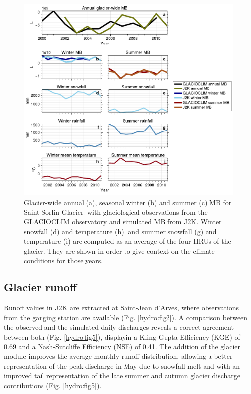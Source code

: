 \begin{figure}[h]
\centering
\includegraphics[width=15cm]{Figures/hydro/Figure_4.pdf}
\caption{Glacier-wide annual (a), seasonal winter (b) and summer (c) MB for Saint-Sorlin Glacier, with glaciological observations from the GLACIOCLIM observatory and simulated MB from J2K. Winter snowfall (d) and temperature (h), and summer snowfall (g) and temperature (i) are computed as an average of the four HRUs of the glacier. They are shown in order to give context on the climate conditions for those years.} 
\label{hydro:fig4}
\end{figure}


\subsection{Glacier runoff}

Runoff values in J2K are extracted at Saint-Jean d'Arves, where observations from the gauging station are available (Fig. \ref{hydro:fig2}). A comparison between the observed and the  simulated daily discharges reveals a correct agreement between both (Fig. \ref{hydro:fig5}), displayin a Kling-Gupta Efficiency (KGE) of 0.69 and a Nash-Sutcliffe Efficiency (NSE) of 0.41. The addition of the glacier module improves the average monthly runoff distribution, allowing a better representation of the peak discharge in May due to snowfall melt and with an improved tail representation of the late summer and autumn glacier discharge contributions (Fig. \ref{hydro:fig5}). 

